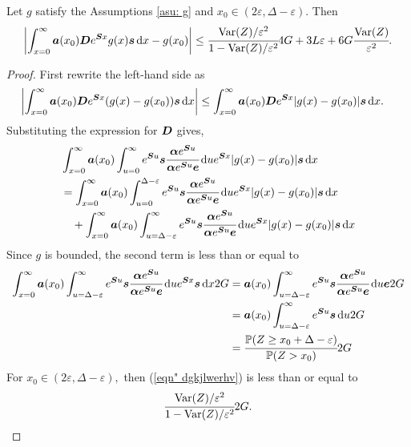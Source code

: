 \begin{lem} \label{lem:tttttt}
	Let \(g\) satisfy the Assumptions \ref{asu: g} and \(x_0\in(2\varepsilon,\Delta-\varepsilon)\). Then
	\begin{align}
		\left|\int_{x=0}^\infty \boldsymbol a(x_0)\boldsymbol De^{\boldsymbol Sx}g(x)\boldsymbol s\, \mathrm{d} x - g(x_0)\right| \leq \cfrac{\mathrm{Var}(Z)/\varepsilon^2}{1-\mathrm{Var}(Z)/\varepsilon^2}4G + 3L\varepsilon+6G\cfrac{\mathrm{Var}(Z)}{\varepsilon^2}.
	\end{align}
\end{lem}
\begin{proof}
	First rewrite the left-hand side as 
	\begin{align}
		\left|\int_{x=0}^\infty \boldsymbol a(x_0)\boldsymbol De^{\boldsymbol Sx}(g(x)-g(x_0))\boldsymbol s\, \mathrm{d} x \right|
		&\leq \int_{x=0}^\infty \boldsymbol a(x_0)\boldsymbol De^{\boldsymbol Sx}|g(x)-g(x_0)|\boldsymbol s\, \mathrm{d} x.
	\end{align}
	Substituting the expression for \(\boldsymbol D\) gives,
	\begin{align}
		&\int_{x=0}^\infty \boldsymbol a(x_0)\int_{u=0}^\infty e^{\boldsymbol Su}\boldsymbol s \cfrac{\boldsymbol \alpha e^{\boldsymbol Su}}{\boldsymbol \alpha e^{\boldsymbol Su}\boldsymbol e} \, \mathrm{d} u e^{\boldsymbol Sx}|g(x)-g(x_0)|\boldsymbol s\, \mathrm{d} x  \nonumber 
		\\&= \int_{x=0}^\infty \boldsymbol a(x_0)\int_{u=0}^{\Delta-\varepsilon} e^{\boldsymbol Su}\boldsymbol s \cfrac{\boldsymbol \alpha e^{\boldsymbol Su}}{\boldsymbol \alpha e^{\boldsymbol Su}\boldsymbol e} \, \mathrm{d} u e^{\boldsymbol Sx}|g(x)-g(x_0)|\boldsymbol s\, \mathrm{d} x \nonumber
		\\&\quad {} + \int_{x=0}^\infty \boldsymbol a(x_0)\int_{u=\Delta-\varepsilon}^\infty e^{\boldsymbol Su}\boldsymbol s \cfrac{\boldsymbol \alpha e^{\boldsymbol Su}}{\boldsymbol \alpha e^{\boldsymbol Su}\boldsymbol e} \, \mathrm{d} u e^{\boldsymbol Sx}|g(x)-g(x_0)|\boldsymbol s\, \mathrm{d} x \label{eqn: 2nd here}
	\end{align}
	Since \(g\) is bounded, the second term is less than or equal to 
	\begin{align}
		\int_{x=0}^\infty \boldsymbol a(x_0)\int_{u=\Delta-\varepsilon}^\infty e^{\boldsymbol Su}\boldsymbol s \cfrac{\boldsymbol \alpha e^{\boldsymbol Su}}{\boldsymbol \alpha e^{\boldsymbol Su}\boldsymbol e} \, \mathrm{d} u e^{\boldsymbol Sx}\boldsymbol s\, \mathrm{d} x 2G \nonumber
		&= \boldsymbol a(x_0)\int_{u=\Delta-\varepsilon}^\infty e^{\boldsymbol Su}\boldsymbol s \cfrac{\boldsymbol \alpha e^{\boldsymbol Su}}{\boldsymbol \alpha e^{\boldsymbol Su}\boldsymbol e} \, \mathrm{d} u \boldsymbol e 2G \nonumber
		\\&= \boldsymbol a(x_0)\int_{u=\Delta-\varepsilon}^\infty e^{\boldsymbol Su}\boldsymbol s \, \mathrm{d} u2G \nonumber
		\\&= \cfrac{\mathbb P(Z\geq x_0+\Delta-\varepsilon)}{\mathbb P(Z>x_0)}2G \label{eqn" dgkjlwerhv}
	\end{align}
	For \(x_0\in(2\varepsilon,\Delta-\varepsilon),\) then (\ref{eqn" dgkjlwerhv}) is less than or equal to 
	\[\cfrac{\mathrm{Var}(Z)/\varepsilon^2}{1-\mathrm{Var}(Z)/\varepsilon^2}2G.\]
	

\end{proof}
